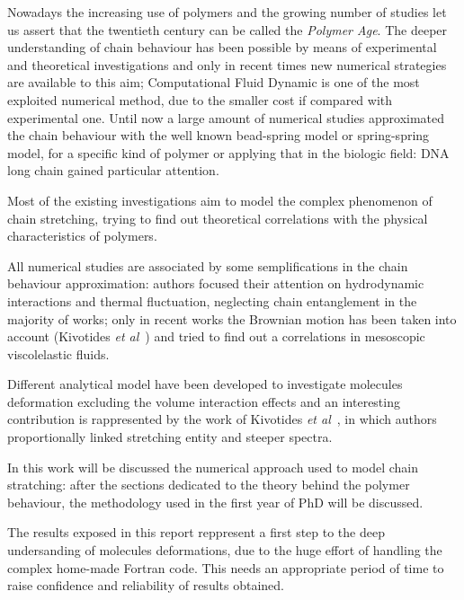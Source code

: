 Nowadays the increasing use of polymers and the growing number of studies let us assert that the twentieth %
century can be called the \textit{Polymer Age}.
The deeper understanding of chain behaviour has been possible by means of experimental and theoretical investigations and only in recent times new numerical strategies are available to this aim; Computational Fluid Dynamic is one of the most exploited numerical method, due to the smaller cost if compared with experimental one.
Until now a large amount of numerical studies approximated the chain behaviour with the well known bead-spring model or spring-spring model, for a specific kind of polymer or applying that in the biologic field: DNA long chain gained particular attention.

Most of the existing investigations aim to model the complex phenomenon of chain stretching, trying to find out theoretical correlations with the physical characteristics of polymers.

All numerical studies are associated by some semplifications in the chain behaviour approximation: authors focused their attention on hydrodynamic interactions and thermal fluctuation, neglecting chain entanglement in the majority of works; only in recent works the Brownian motion has been taken into account (Kivotides \emph{et al}~\cite{demos2}) and tried to find out a correlations in mesoscopic viscolelastic fluids.

Different analytical model have been developed to investigate molecules deformation excluding the volume interaction effects and an interesting contribution is rappresented by the work of Kivotides \emph{et al}~\cite{demos3}, in which authors proportionally linked stretching entity and steeper spectra.

In this work will be discussed the numerical approach used to model chain stratching: after the sections dedicated to the theory behind the polymer behaviour, the methodology used in the first year of PhD will be discussed.

The results exposed in this report reppresent a first step to the deep undersanding of molecules deformations, due to the huge effort of handling the complex home-made Fortran code. This needs an appropriate period of time to raise confidence and reliability of results obtained.









